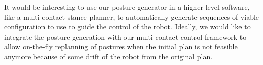 It would be interesting to use our posture generator in a higher level software, like a multi-contact stance planner, to automatically generate sequences of viable configuration to use to guide the control of the robot.
Ideally, we would like to integrate the posture generation with our multi-contact control framework to allow on-the-fly replanning of postures when the initial plan is not feasible anymore because of some drift of the robot from the original plan.







